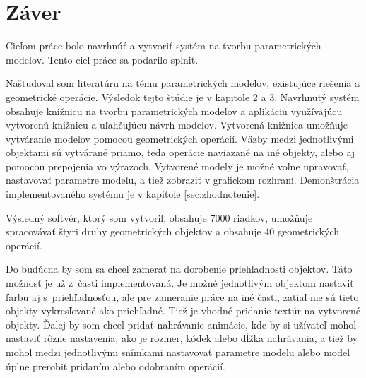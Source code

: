 \chapter{Záver}
Cieľom práce bolo navrhnúť a vytvoriť systém na tvorbu parametrických modelov. Tento cieľ práce sa podarilo splniť. 


Naštudoval som literatúru na tému parametrických modelov, existujúce riešenia a geometrické operácie. Výsledok tejto štúdie je v kapitole 2 a 3. 
Navrhnutý systém obsahuje knižnicu na tvorbu parametrických modelov a aplikáciu využívajúcu vytvorenú knižnicu a uľahčujúcu návrh modelov.
Vytvorená knižnica umožňuje vytváranie modelov pomocou geometrických operácií. Väzby medzi jednotlivými objektami sú vytvárané  priamo, teda operácie naviazané na iné objekty, alebo aj pomocou prepojenia vo výrazoch. Vytvorené modely je možné voľne upravovať, nastavovať parametre modelu, a tiež zobraziť v grafickom rozhraní. Demonštrácia implementovaného systému je v kapitole \ref{sec:zhodnotenie}.

Výsledný softvér, ktorý som vytvoril, obsahuje 7000 riadkov, umožňuje spracovávať štyri druhy geometrických objektov a obsahuje 40 geometrických operácií. 

Do budúcna by som sa chcel zamerať na dorobenie priehľadnosti objektov. Táto možnosť je už z~časti implementovaná. Je možné jednotlivým objektom nastaviť farbu aj s~priehľadnosťou, ale pre zameranie práce na iné časti, zatiaľ nie sú tieto objekty vykresľované ako priehľadné.
Tiež je vhodné pridanie textúr na vytvorené objekty.
Ďalej by som chcel pridať nahrávanie animácie, kde by si užívateľ mohol nastaviť rôzne nastavenia, ako je rozmer, kódek alebo dĺžka nahrávania, a tiež by mohol medzi jednotlivými snímkami nastavovať parametre modelu alebo model úplne prerobiť pridaním alebo odobraním operácií.  












